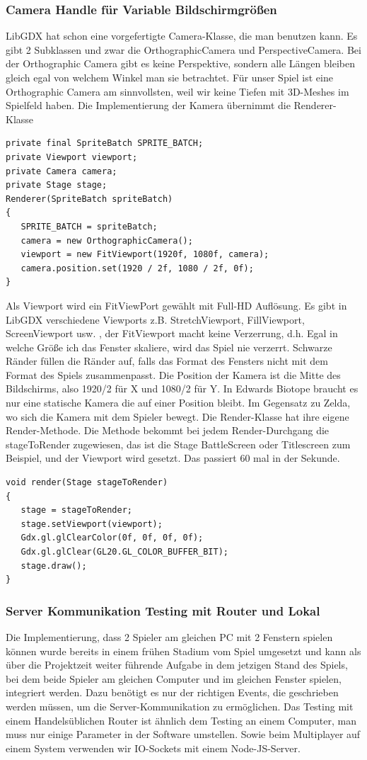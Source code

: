 \subsubsection{Camera Handle für Variable Bildschirmgrößen}
LibGDX hat schon eine vorgefertigte Camera-Klasse, die man benutzen kann. Es gibt 2 Subklassen und zwar die OrthographicCamera und PerspectiveCamera. Bei der Orthographic Camera gibt es keine Perspektive, sondern alle Längen bleiben gleich egal von welchem Winkel man sie betrachtet.
Für unser Spiel ist eine Orthographic Camera am sinnvollsten, weil wir keine Tiefen mit 3D-Meshes im Spielfeld haben.
Die Implementierung der Kamera übernimmt die Renderer-Klasse
\begin{lstlisting}
private final SpriteBatch SPRITE_BATCH;
private Viewport viewport;
private Camera camera;
private Stage stage;
Renderer(SpriteBatch spriteBatch)
{
   SPRITE_BATCH = spriteBatch;
   camera = new OrthographicCamera();
   viewport = new FitViewport(1920f, 1080f, camera);
   camera.position.set(1920 / 2f, 1080 / 2f, 0f);
}
\end{lstlisting}
Als Viewport wird ein FitViewPort gewählt mit Full-HD Auflösung. Es gibt in LibGDX verschiedene Viewports z.B. StretchViewport, FillViewport, ScreenViewport usw. , der FitViewport
macht keine Verzerrung, d.h. Egal in welche Größe ich das Fenster skaliere, wird das Spiel nie verzerrt. Schwarze Ränder füllen die Ränder auf, falls das Format des Fensters nicht mit dem Format des Spiels zusammenpasst. Die Position der Kamera ist die Mitte des Bildschirms, also 1920/2 für X und 1080/2 für Y. In Edwards Biotope braucht es nur eine statische Kamera die auf einer Position bleibt. Im Gegensatz zu Zelda, wo sich die Kamera mit dem Spieler bewegt.
Die Render-Klasse hat ihre eigene Render-Methode. Die Methode bekommt bei jedem Render-Durchgang die stageToRender zugewiesen, das ist die Stage BattleScreen oder Titlescreen zum Beispiel, und der Viewport wird gesetzt. Das passiert 60 mal in der Sekunde.
\begin{lstlisting}
void render(Stage stageToRender)
{
   stage = stageToRender;
   stage.setViewport(viewport);
   Gdx.gl.glClearColor(0f, 0f, 0f, 0f);
   Gdx.gl.glClear(GL20.GL_COLOR_BUFFER_BIT);
   stage.draw();
}
\end{lstlisting}

\subsubsection{Server Kommunikation Testing mit Router und Lokal}
Die Implementierung, dass 2 Spieler am gleichen PC mit 2 Fenstern spielen können wurde bereits in einem frühen Stadium vom Spiel umgesetzt und kann als über die Projektzeit weiter führende Aufgabe in dem jetzigen Stand des Spiels, bei dem beide Spieler am gleichen Computer und im gleichen Fenster spielen, integriert werden. Dazu benötigt es nur der richtigen Events, die geschrieben werden müssen, um die Server-Kommunikation zu ermöglichen.
Das Testing mit einem Handelsüblichen Router ist ähnlich dem Testing an einem Computer, man muss nur einige Parameter in der Software umstellen.
Sowie beim Multiplayer auf einem System verwenden wir IO-Sockets mit einem Node-JS-Server.

